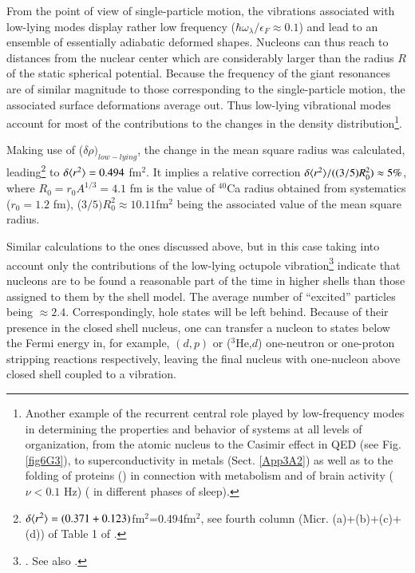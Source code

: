 From the point of view of  single-particle motion, the vibrations associated with low-lying modes display rather low frequency ($\hbar\omega_\lambda/\epsilon_F\approx0.1$) and lead to an ensemble of essentially adiabatic deformed shapes. Nucleons can thus reach to distances from the nuclear center which are considerably larger than the radius $R$ of the static spherical potential. Because the frequency of the giant resonances are of similar magnitude to those corresponding to the single-particle motion, the associated surface deformations average out. 
Thus low-lying vibrational modes  account for most of the contributions to the changes in the density distribution\footnote{\label{f52C1} Another example of the  recurrent central role played by low-frequency modes in determining the properties and behavior of systems at all levels of organization, from the atomic nucleus to the Casimir effect in QED (see Fig. \ref{fig6G3}), to  superconductivity in metals (Sect. \ref{App3A2}) as well as  to the folding of proteins (\cite{Micheletti:04}) in connection with metabolism and of brain  activity ($\nu<0.1$ Hz) (\cite{Mitra:18,Vyazovskiy:13} in different phases of sleep).}. 


Making use of  ($\delta\rho)_{low-lying}$, the change in the mean square radius  was calculated, leading\footnote{$\delta\langle {r^2} \rangle=(0.371+0.123)$fm$^2$=0.494fm$^2$, see fourth column (Micr. (a)+(b)+(c)+(d)) of Table 1 of \cite{Barranco:87a}.} to $\delta\langle {r^2} \rangle=0.494$ fm$^2$. It implies a relative correction $\delta\langle {r^2} \rangle/((3/5)R_0^2)\approx5\%$, where $R_0=r_0A^{1/3}=4.1$ fm is the value of $^{40}$Ca radius obtained from systematics ($r_0=1.2$ fm), ($3/5)R_0^2\approx 10.11$fm$^2$ being the associated value of the mean square radius.

Similar calculations to the ones discussed above, but in this case taking into account only the contributions of the low-lying octupole vibration\footnote{\cite{Brown:63}. See also \cite{Anderson:62}.} indicate that nucleons are to be found a reasonable part of the time in higher shells than those assigned to them by the shell model. The average number of ``excited'' particles being $\approx2.4$. 
Correspondingly, hole states will be left behind. Because of their presence  in the closed shell nucleus, one can transfer a nucleon to states below the Fermi energy in, for example, $(d,p)$ or ($^3$He,$d$) one-neutron or one-proton stripping reactions respectively, leaving the final nucleus with one-nucleon above closed shell coupled to a vibration.


